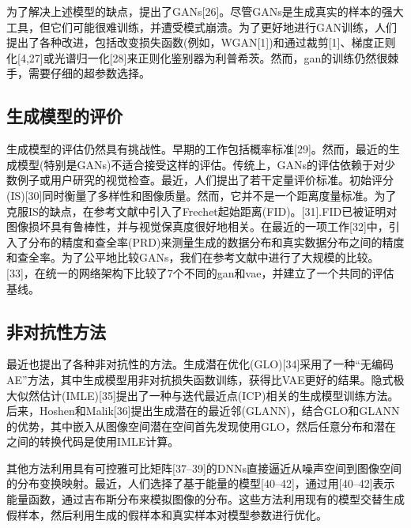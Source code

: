 为了解决上述模型的缺点，提出了GANs[26]。尽管GANs是生成真实的样本的强大工具，但它们可能很难训练，并遭受模式崩溃。为了更好地进行GAN训练，人们提出了各种改进，包括改变损失函数(例如，WGAN[1])和通过裁剪[1]、梯度正则化[4,27]或光谱归一化[28]来正则化鉴别器为利普希茨。然而，gan的训练仍然很棘手，需要仔细的超参数选择。

\subsection{生成模型的评价}

生成模型的评估仍然具有挑战性。早期的工作包括概率标准[29]。然而，最近的生成模型(特别是GANs)不适合接受这样的评估。传统上，GANs的评估依赖于对少数例子或用户研究的视觉检查。最近，人们提出了若干定量评价标准。初始评分(IS)[30]同时衡量了多样性和图像质量。然而，它并不是一个距离度量标准。为了克服IS的缺点，在参考文献中引入了Frechet起始距离(FID)。[31].FID已被证明对图像损坏具有鲁棒性，并与视觉保真度很好地相关。在最近的一项工作[32]中，引入了分布的精度和查全率(PRD)来测量生成的数据分布和真实数据分布之间的精度和查全率。为了公平地比较GANs，我们在参考文献中进行了大规模的比较。[33]，在统一的网络架构下比较了7个不同的gan和vae，并建立了一个共同的评估基线。

\subsection{非对抗性方法}

最近也提出了各种非对抗性的方法。生成潜在优化(GLO)[34]采用了一种“无编码AE”方法，其中生成模型用非对抗损失函数训练，获得比VAE更好的结果。隐式极大似然估计(IMLE)[35]提出了一种与迭代最近点(ICP)相关的生成模型训练方法。后来，Hoshen和Malik[36]提出生成潜在的最近邻(GLANN)，结合GLO和GLANN的优势，其中嵌入从图像空间潜在空间首先发现使用GLO，然后任意分布和潜在之间的转换代码是使用IMLE计算。

其他方法利用具有可控雅可比矩阵[37–39]的DNNs直接逼近从噪声空间到图像空间的分布变换映射。最近，人们选择了基于能量的模型[40–42]，通过用[40–42]表示能量函数，通过吉布斯分布来模拟图像的分布。这些方法利用现有的模型交替生成假样本，然后利用生成的假样本和真实样本对模型参数进行优化。